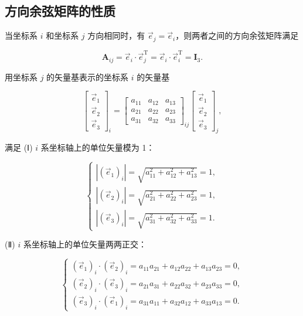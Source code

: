 \subsection{方向余弦矩阵的性质}
\begin{theorem}
当坐标系 $i$ 和坐标系 $j$ 方向相同时，有 $\vec{e}_j=\vec{e}_i$，则两者之间的方向余弦矩阵满足

\[
\boldsymbol{A}_{ij}=\vec{e}_i\cdot\vec{e}_j^{\mathrm{T}}=\vec{e}_i\cdot\vec{e}_i^{\mathrm{T}}=\boldsymbol{I}_3.
\]
\end{theorem}
\begin{theorem}
用坐标系 $j$ 的矢量基表示的坐标系 $i$ 的矢量基

\[
\begin{bmatrix}\vec{e}_1\\\vec{e}_2\\\vec{e}_3\end{bmatrix}_i=\begin{bmatrix}a_{11}&a_{12}&a_{13}\\a_{21}&a_{22}&a_{23}\\a_{31}&a_{32}&a_{33}\end{bmatrix}_{ij}\begin{bmatrix}\vec{e}_1\\\vec{e}_2\\\vec{e}_3\end{bmatrix}_j,
\]

满足 (Ⅰ) $i$ 系坐标轴上的单位矢量模为 1：

\[
\begin{cases}|(\vec{e}_1)_i|=\sqrt{a_{11}^2+a_{12}^2+a_{13}^2}=1,\\|(\vec{e}_2)_i|=\sqrt{a_{21}^2+a_{22}^2+a_{23}^2}=1,\\|(\vec{e}_3)_i|=\sqrt{a_{31}^2+a_{32}^2+a_{33}^2}=1.\end{cases}
\]

(Ⅱ) $i$ 系坐标轴上的单位矢量两两正交：

\[
\begin{cases}(\vec{e}_1)_i\cdot(\vec{e}_2)_i=a_{11}a_{21}+a_{12}a_{22}+a_{13}a_{23}=0,\\(\vec{e}_2)_i\cdot(\vec{e}_3)_i=a_{21}a_{31}+a_{22}a_{32}+a_{23}a_{33}=0,\\(\vec{e}_3)_i\cdot(\vec{e}_1)_i=a_{31}a_{11}+a_{32}a_{12}+a_{33}a_{13}=0.\end{cases}
\]
\end{theorem}
